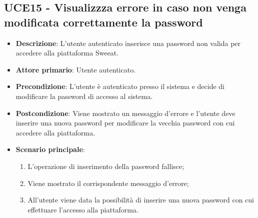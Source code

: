 \subsection{UCE15 - Visualizzza errore in caso non venga modificata correttamente la password}
\begin{itemize}
\item \textbf{Descrizione}: L'utente autenticato inserisce una password non valida per accedere alla piattaforma Sweeat.
\item \textbf{Attore primario}: Utente autenticato.
\item \textbf{Precondizione}: L'utente è autenticato presso il sistema e decide di modificare la password di accesso al sistema.
\item \textbf{Postcondizione}: Viene mostrato un messaggio d'errore e l'utente deve inserire una nuova password per modificare la vecchia password con cui accedere alla piattaforma.

\item \textbf{Scenario principale}:
\begin{enumerate}
\item L'operazione di inserimento della password fallisce;
\item Viene mostrato il corrispondente messaggio d'errore;
\item All'utente viene data la possibilità di inserire una nuova password con cui effettuare l'accesso alla piattaforma.
\end{enumerate}
\end{itemize}